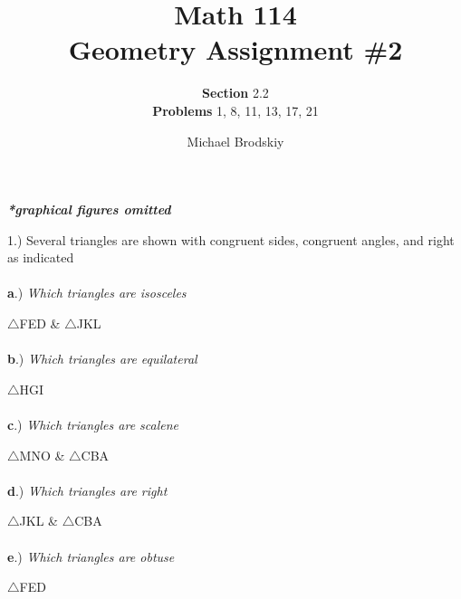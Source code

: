 \documentclass[12pt]{article}
\title{Math 114 \\ Geometry Assignment \#2}
\date{}
\subtitle{\textbf{Section} 2.2\\\textbf{Problems} 1, 8, 11, 13, 17, 21}
\author{Michael Brodskiy}
\begin{document}
\maketitle
\begin{center} \textbf{\textit{*graphical figures omitted}} \end{center} 
{\setlength{\parindent}{0cm}
1.) Several triangles are shown with congruent sides, congruent angles, and right as indicated
\paragraph{}\textbf{a}.) \textit{Which triangles are isosceles} \begin{center} $\bigtriangleup$\textsc{FED} \& $\bigtriangleup$\textsc{JKL} \end{center}
\paragraph{}\textbf{b}.) \textit{Which triangles are equilateral} \begin{center} $\bigtriangleup$\textsc{HGI}  \end{center}
\paragraph{}\textbf{c}.) \textit{Which triangles are scalene} \begin{center} $\bigtriangleup$\textsc{MNO} \& $\bigtriangleup$\textsc{CBA} \end{center}
\paragraph{}\textbf{d}.) \textit{Which triangles are right} \begin{center} $\bigtriangleup$\textsc{JKL} \& $	\bigtriangleup$\textsc{CBA} \end{center}
\paragraph{}\textbf{e}.) \textit{Which triangles are obtuse} \begin{center} $\bigtriangleup$\textsc{FED} \end{center}
}
\end{document}
